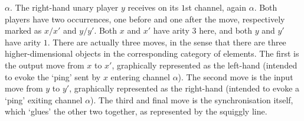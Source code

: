 \documentclass{LMCS}
\theoremstyle{plain}\newtheorem{satz}[thm]{Satz}
\begin{document}
$\alpha$. The right-hand unary player $y$ receives on its $1$st
channel, again $\alpha$. Both players have two occurrences, one before
and one after the move, respectively marked as $x / x'$ and $y / y'$.
Both $x$ and $x'$ have arity $3$ here, and both $y$ and $y'$ have
arity $1$. There are actually three moves, in the sense that
there are three higher-dimensional objects in the corresponding
category of elements.  The first is the output move from $x$ to $x'$,
graphically represented as the left-hand 
(intended to evoke the `ping' sent by $x$ entering channel $\alpha$).
The second move is the input move from $y$ to $y'$, graphically represented
as the right-hand
 (intended to evoke a `ping' exiting channel $\alpha$).  The
      third and final move is the synchronisation itself, which
      `glues' the other two together, as represented by the squiggly
      line.
\end{document}
